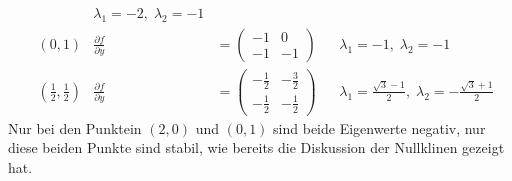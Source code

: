 \begin{beispiel}
\begin{align*}
		&&\lambda_1=-2,\;\lambda_2=-1\\
&(0,1)
	&\frac{\partial f}{\partial y}&=\begin{pmatrix}-1&0\\-1&-1\end{pmatrix}
		&&\lambda_1=-1,\;\lambda_2=-1\\
&\textstyle(\frac12,\frac12)
	&\frac{\partial f}{\partial y}&=\begin{pmatrix}-\frac12&-\frac32\\-\frac12&-\frac12\end{pmatrix}
		&&\lambda_1=\frac{\sqrt{3}-1}2,\;\lambda_2=-\frac{\sqrt{3}+1}2
\end{align*}
Nur bei den Punktein $(2,0)$ und $(0,1)$ sind beide Eigenwerte negativ,
nur diese beiden Punkte sind stabil, wie bereits die  Diskussion der
Nullklinen gezeigt hat.
\end{beispiel}

